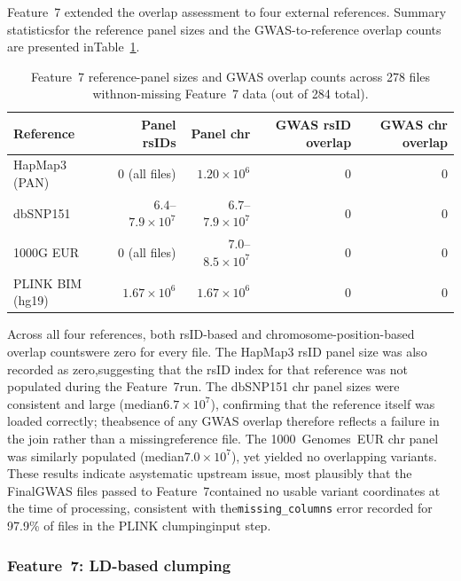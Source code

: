 \documentclass[11pt,a4paper]{article}
\begin{document}
Feature~7 extended the overlap assessment to four external references. Summary statisticsfor the reference panel sizes and the GWAS-to-reference overlap counts are presented inTable~\ref{tab}.

\begin{table}[h]
\centering
\caption{Feature~7 reference-panel sizes and GWAS overlap counts across 278 files withnon-missing Feature~7 data (out of 284 total).}
\label{tab}
\begin{tabular}{lrrrr}
\toprule
Reference & Panel rsIDs & Panel chr & GWAS rsID overlap & GWAS chr overlap \\
\midrule
HapMap3 (PAN)     & 0 (all files)       & $1.20\times10^{6}$ & 0 & 0 \\
dbSNP151          & $6.4$--$7.9\times10^{7}$ & $6.7$--$7.9\times10^{7}$ & 0 & 0 \\
1000G EUR         & 0 (all files)       & $7.0$--$8.5\times10^{7}$ & 0 & 0 \\
PLINK BIM (hg19)  & $1.67\times10^{6}$  & $1.67\times10^{6}$ & 0 & 0 \\
\bottomrule
\end{tabular}
\end{table}

Across all four references, both rsID-based and chromosome-position-based overlap countswere zero for every file. The HapMap3 rsID panel size was also recorded as zero,suggesting that the rsID index for that reference was not populated during the Feature~7run. The dbSNP151 chr panel sizes were consistent and large (median$6.7\times10^{7}$), confirming that the reference itself was loaded correctly; theabsence of any GWAS overlap therefore reflects a failure in the join rather than a missingreference file. The 1000~Genomes~EUR chr panel was similarly populated (median$7.0\times10^{7}$), yet yielded no overlapping variants. These results indicate asystematic upstream issue, most plausibly that the FinalGWAS files passed to Feature~7contained no usable variant coordinates at the time of processing, consistent with the\texttt{missing\_columns} error recorded for 97.9\% of files in the PLINK clumpinginput step.

\subsubsection*{Feature~7: LD-based clumping}
\end{document}
